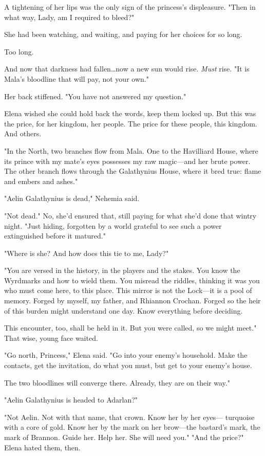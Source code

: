 A tightening of her lips was the only sign of the princess's displeasure.
"Then in what way, Lady, am I required to bleed?"

She had been watching, and waiting, and paying for her choices for so long.

Too long.

And now that darkness had fallen\ldots now a new sun would rise.
\emph{Must} rise.
"It is Mala's bloodline that will pay, not your own."

Her back stiffened.
"You have not answered my question."

Elena wished she could hold back the words, keep them locked up.
But this was the price, for her kingdom, her people.
The price for these people, this kingdom.
And others.

"In the North, two branches flow from Mala.
One to the Havilliard House, where its prince with my mate's eyes possesses my raw magic---and her brute power.
The other branch flows through the Galathynius House, where it bred true: flame and embers and ashes."

"Aelin Galathynius is dead," Nehemia said.

"Not dead."
No, she'd ensured that, still paying for what she'd done that wintry night.
"Just hiding, forgotten by a world grateful to see such a power extinguished before it matured."

"Where is she?
And how does this tie to me, Lady?"

"You are versed in the history, in the players and the stakes.
You know the Wyrdmarks and how to wield them.
You misread the riddles, thinking it was you who must come here, to this place.
This mirror is not the Lock---it is a pool of memory.
Forged by myself, my father, and Rhiannon Crochan.
Forged so the heir of this burden might understand one day.
Know everything before deciding.

This encounter, too, shall be held in it.
But you were called, so we might meet."
That wise, young face waited.

"Go north, Princess," Elena said.
"Go into your enemy's household.
Make the contacts, get the invitation, do what you must, but get to your enemy's house.

The two bloodlines will converge there.
Already, they are on their way."

"Aelin Galathynius is headed to Adarlan?"

"Not Aelin.
Not with that name, that crown.
Know her by her eyes--- turquoise with a core of gold.
Know her by the mark on her brow---the bastard's mark, the mark of Brannon.
Guide her.
Help her.
She will need you."
"And the price?"
Elena hated them, then.

